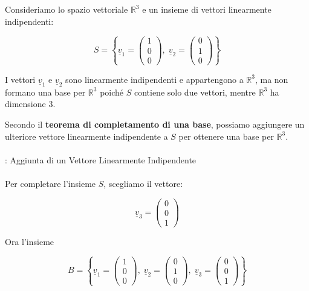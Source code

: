 \begin{es}
  Consideriamo lo spazio vettoriale \( \mathbb{R}^3 \) e un insieme
  di vettori linearmente indipendenti:

  \[
    S = \left\{ \underline{v}_1 =
      \begin{pmatrix} 1 \\ 0 \\ 0
      \end{pmatrix}, \; \underline{v}_2 =
      \begin{pmatrix} 0 \\ 1 \\ 0
    \end{pmatrix} \right\}
  \]

  I vettori \( \underline{v}_1 \) e \( \underline{v}_2 \) sono
  linearmente indipendenti e appartengono a \( \mathbb{R}^3 \), ma
  non formano una base per \( \mathbb{R}^3 \) poiché \( S \) contiene
  solo due vettori, mentre \( \mathbb{R}^3 \) ha dimensione 3.

  Secondo il \textbf{teorema di completamento di una base}, possiamo
  aggiungere un ulteriore vettore linearmente indipendente a \( S \)
  per ottenere una base per \( \mathbb{R}^3 \).
  \leavevmode\\\\
  : Aggiunta di un Vettore Linearmente Indipendente
  \leavevmode\\\\
  Per completare l'insieme \( S \), scegliamo il vettore:

  \[
    \underline{v}_3 =
    \begin{pmatrix} 0 \\ 0 \\ 1
    \end{pmatrix}
  \]

  Ora l'insieme

  \[
    B = \left\{ \underline{v}_1 =
      \begin{pmatrix} 1 \\ 0 \\ 0
      \end{pmatrix}, \; \underline{v}_2 =
      \begin{pmatrix} 0 \\ 1 \\ 0
      \end{pmatrix}, \; \underline{v}_3 =
      \begin{pmatrix} 0 \\ 0 \\ 1
    \end{pmatrix} \right\}
  \]


\end{es}
